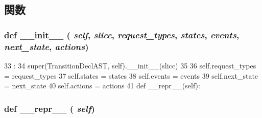 \subsection{関数}
\hypertarget{classslicc_1_1ast_1_1TransitionDeclAST_1_1TransitionDeclAST_ac775ee34451fdfa742b318538164070e}{
\subsubsection[{\_\-\_\-init\_\-\_\-}]{\setlength{\rightskip}{0pt plus 5cm}def \_\-\_\-init\_\-\_\- ( {\em self}, \/   {\em slicc}, \/   {\em request\_\-types}, \/   {\em states}, \/   {\em events}, \/   {\em next\_\-state}, \/   {\em actions})}}
\label{classslicc_1_1ast_1_1TransitionDeclAST_1_1TransitionDeclAST_ac775ee34451fdfa742b318538164070e}



\begin{DoxyCode}
33                          :
34         super(TransitionDeclAST, self).__init__(slicc)
35 
36         self.request_types = request_types
37         self.states = states
38         self.events = events
39         self.next_state = next_state
40         self.actions = actions
41 
    def __repr__(self):
\end{DoxyCode}
\hypertarget{classslicc_1_1ast_1_1TransitionDeclAST_1_1TransitionDeclAST_ad8b9328939df072e4740cd9a63189744}{
\subsubsection[{\_\-\_\-repr\_\-\_\-}]{\setlength{\rightskip}{0pt plus 5cm}def \_\-\_\-repr\_\-\_\- ( {\em self})}}
\label{classslicc_1_1ast_1_1TransitionDeclAST_1_1TransitionDeclAST_ad8b9328939df072e4740cd9a63189744}




